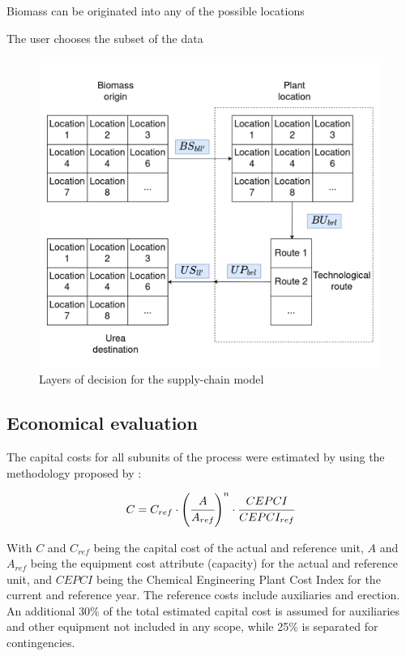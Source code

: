 \documentclass[a4paper, titlepage]{article}
\begin{document}
Biomass can be originated into any of the possible locations 

The user chooses the subset of the data
	
\begin{figure}
	\includegraphics[width=\textwidth]{img/layers_of_decision.png}
	\caption{Layers of decision for the supply-chain model}
	\label{img_layers}
\end{figure}


\subsection{Economical evaluation}
The capital costs for all subunits of the process were estimated by using the methodology proposed by
\textcite{turtonAnalysisSynthesisDesign2018}:

\begin{equation}
	C = C_{ref} \cdot \left( \cfrac{A}{A_{ref}} \right)^n \cdot \cfrac{CEPCI}{CEPCI_{ref}}
\end{equation}

With $C$ and $C_{ref}$ being the capital cost of the actual and reference unit, $A$ and $A_{ref}$ being the equipment
cost attribute (capacity) for the actual and reference unit, and $CEPCI$ being the Chemical Engineering Plant
Cost Index for the current and reference year. The reference costs include auxiliaries and erection. An additional
30\% of the total estimated capital cost is assumed for auxiliaries and other equipment not included in any scope,
while 25\% is separated for contingencies.
\end{document}
